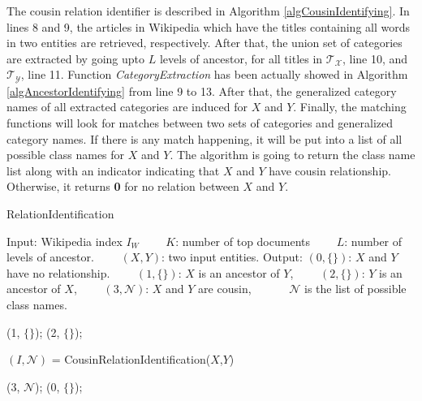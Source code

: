 The cousin relation identifier is described in Algorithm \ref{algCousinIdentifying}. In lines 8 and 9, the articles in Wikipedia which have the titles containing all words in two entities are retrieved, respectively. After that, the union set of categories are extracted by going upto $L$ levels of ancestor, for all titles in $\mathcal{T_{X}}$, line 10, and $\mathcal{T_{Y}}$, line 11. Function {\em CategoryExtraction} has been actually showed in Algorithm \ref{algAncestorIdentifying} from line 9 to 13. After that, the generalized category names of all extracted categories are induced for $X$ and $Y$. Finally, the matching functions will look for matches between two sets of categories and generalized category names. If there is any match happening, it will be put into a list of all possible class names for $X$ and $Y$. The algorithm is going to return the class name list along with an indicator indicating that $X$ and $Y$ have cousin relationship. Otherwise, it returns {\bf 0} for no relation between $X$ and $Y$.

\begin{algorithm}[t]
{\small
\caption{RelationIdentification}
\label{algRelationIdentifying} 
\begin{algorithmic}[1]
\STATE Input: Wikipedia index $I_{W	}$ 
\STATE $\qquad$$K$: number of top documents 
\STATE $\qquad$$L$: number of levels of ancestor. 
\STATE $\qquad$$(X, Y)$: two input entities. 
\STATE Output: $(0, \{\})$: $X$ and $Y$ have no relationship. 
\STATE $\qquad$$(1, \{\})$: $X$ is an ancestor of $Y$,
\STATE $\qquad$$(2, \{\})$: $Y$ is an ancestor of $X$,
\STATE $\qquad$$(3, {\mathcal N})$: $X$ and $Y$ are cousin,
\STATE $\quad\qquad$${\mathcal N}$ is the list of possible class names. 

\RETURN (1, $\{\}$);
\ELSE
{}
\RETURN  (2, $\{\}$);
\ENDIF
\ENDIF

\STATE $(I, {\mathcal N})$ = CousinRelationIdentification($X$,$Y$)

\RETURN (3, ${\mathcal N}$);
\ELSE
\RETURN (0, $\{\}$);
\ENDIF

\end{algorithmic} 
}
\end{algorithm} 


